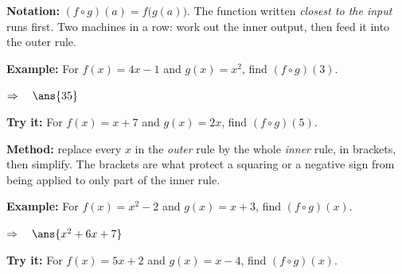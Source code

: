 \documentclass[12pt]{article}
\begin{document}


\begin{formulabox}
\textbf{Notation:} $(f \circ g)(a) = f\bigl(g(a)\bigr)$. The function written
\emph{closest to the input} runs first. Two machines in a row: work out the inner
output, then feed it into the outer rule.
\end{formulabox}

\begin{examplebox}
\textbf{Example:} \quad For $f(x) = 4x-1$ and $g(x) = x^2$, find
$(f \circ g)(3)$.

$\Rightarrow\quad \ans{35}$
\end{examplebox}

\begin{tryitbox}
\textbf{Try it:} \quad For $f(x) = x+7$ and $g(x) = 2x$, find
$(f \circ g)(5)$.\\[2pt]
\end{tryitbox}


\begin{formulabox}
\textbf{Method:} replace every $x$ in the \emph{outer} rule by the whole
\emph{inner} rule, in brackets, then simplify. The brackets are what protect a
squaring or a negative sign from being applied to only part of the inner rule.
\end{formulabox}

\begin{examplebox}
\textbf{Example:} \quad For $f(x) = x^2-2$ and $g(x) = x+3$, find
$(f \circ g)(x)$.

$\Rightarrow\quad \ans{x^2 + 6x + 7}$
\end{examplebox}

\begin{tryitbox}
\textbf{Try it:} \quad For $f(x) = 5x+2$ and $g(x) = x-4$, find
$(f \circ g)(x)$.\\[2pt]
\end{tryitbox}
\end{document}
